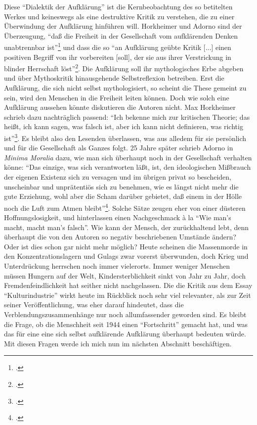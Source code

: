 \documentclass[a4paper, 12pt]{article}
\begin{document}
\begin{onehalfspace}
Diese "`Dialektik der Aufklärung"' ist die Kernbeobachtung des so betitelten Werkes und keineswegs als eine destruktive Kritik zu verstehen, die zu einer Überwindung der Aufklärung hinführen will. Horkheimer und Adorno sind der Überzeugung, "`daß die Freiheit in der Gesellschaft vom aufklärenden Denken unabtrennbar ist"'\footnote{\Cite[Siehe][S. 3]{dialektik-der-aufklaerung}.} und dass die so "`an Aufklärung geübte Kritik [...] einen positiven Begriff von ihr vorbereiten [soll], der sie aus ihrer Verstrickung in blinder Herrschaft löst"'\footnote{\Cite[Siehe][S. 6]{dialektik-der-aufklaerung}.}. Die Aufklärung soll ihr mythologisches Erbe abgeben und über Mythoskritik hinausgehende Selbstreflexion betreiben. Erst die Aufklärung, die sich nicht selbst mythologisiert, so scheint die These gemeint zu sein, wird den Menschen in die Freiheit leiten können. Doch wie solch eine Aufklärung aussehen könnte diskutieren die Autoren nicht. Max Horkheimer schrieb dazu nachträglich passend: "`Ich bekenne mich zur kritischen Theorie; das heißt, ich kann sagen, was falsch ist, aber ich kann nicht definieren, was richtig ist"'\footnote{\Cite[Siehe][S. 150]{gesellschaft}.}. Es bleibt also den Lesenden überlassen, was aus alledem für sie persönlich und für die Gesellschaft als Ganzes folgt. 25 Jahre später schrieb Adorno in \emph{Minima Moralia} dazu, wie man sich überhaupt noch in der Gesellschaft verhalten könne: "`Das einzige, was sich verantworten läßt, ist, den ideologischen Mißbrauch der eigenen Existenz sich zu versagen und im übrigen privat so bescheiden, unscheinbar und unprätentiös sich zu benehmen, wie es längst nicht mehr die gute Erziehung, wohl aber die Scham darüber gebietet, daß einem in der Hölle noch die Luft zum Atmen bleibt"'\footnote{\Cite[Siehe][S. 24]{minima}.}. Solche Sätze zeugen eher von einer düsteren Hoffnungslosigkeit, und hinterlassen einen Nachgeschmack \`{a} la "`Wie man's macht, macht man's falsch"'. Wie kann der Mensch, der zurückhaltend lebt, denn überhaupt die von den Autoren so negativ beschriebenen Umstände ändern? Oder ist dies schon gar nicht mehr möglich? Heute scheinen die Massenmorde in den Konzentrationslagern und Gulags zwar vorerst überwunden, doch Krieg und Unterdrückung herrschen noch immer vielerorts. Immer weniger Menschen müssen Hungern auf der Welt, Kindersterblichkeit sinkt von Jahr zu Jahr, doch Fremdenfeindlichkeit hat seither nicht nachgelassen. Die die Kritik aus dem Essay "`Kulturindustrie"' wirkt heute im Rückblick noch sehr viel relevanter, als zur Zeit seiner Veröffentlichung, was eher darauf hindeutet, dass die Verblendungszusammenhänge nur noch allumfassender geworden sind. Es bleibt die Frage, ob die Menschheit seit 1944 einen "`Fortschritt"' gemacht hat, und was das für eine eine sich selbst aufklärende Aufklärung überhaupt bedeuten würde. Mit diesen Fragen werde ich mich nun im nächsten Abschnitt beschäftigen.


\end{onehalfspace}
\end{document}
